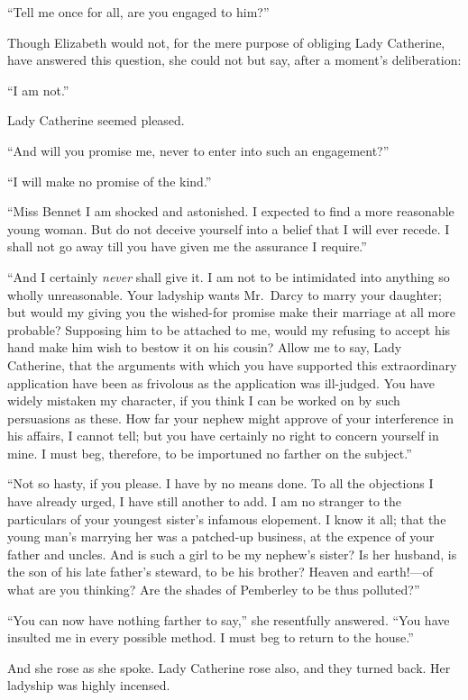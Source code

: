 \documentclass[12pt,english,oneside]{book}
\begin{document}
{}``Tell me once for all, are you engaged to him?''\ 

Though Elizabeth would not, for the mere purpose of obliging Lady
Catherine, have answered this question, she could not but say, after
a moment's deliberation:

{}``I am not.''

Lady Catherine seemed pleased.

{}``And will you promise me, never to enter into such an engagement?''\ 

{}``I will make no promise of the kind.''

{}``Miss Bennet I am shocked and astonished. I expected to find a
more reasonable young woman. But do not deceive yourself into a belief
that I will ever recede. I shall not go away till you have given me
the assurance I require.''

{}``And I certainly \textit{never} shall give it. I am not to be
intimidated into anything so wholly unreasonable. Your ladyship wants
Mr.\ Darcy to marry your daughter; but would my giving you the wished-for
promise make their marriage at all more probable? Supposing him to
be attached to me, would my refusing to accept his hand make him wish
to bestow it on his cousin? Allow me to say, Lady Catherine, that
the arguments with which you have supported this extraordinary application
have been as frivolous as the application was ill-judged. You have
widely mistaken my character, if you think I can be worked on by such
persuasions as these. How far your nephew might approve of your interference
in his affairs, I cannot tell; but you have certainly no right to
concern yourself in mine. I must beg, therefore, to be importuned
no farther on the subject.''

{}``Not so hasty, if you please. I have by no means done. To all
the objections I have already urged, I have still another to add.
I am no stranger to the particulars of your youngest sister's infamous
elopement. I know it all; that the young man's marrying her was a
patched-up business, at the expence of your father and uncles. And
is such a girl to be my nephew's sister? Is her husband, is the son
of his late father's steward, to be his brother? Heaven and earth!\mbox{---}of
what are you thinking? Are the shades of Pemberley to be thus polluted?''\ 

{}``You can now have nothing farther to say,'' she resentfully answered.
{}``You have insulted me in every possible method. I must beg to
return to the house.''

And she rose as she spoke. Lady Catherine rose also, and they turned
back. Her ladyship was highly incensed.
\end{document}
